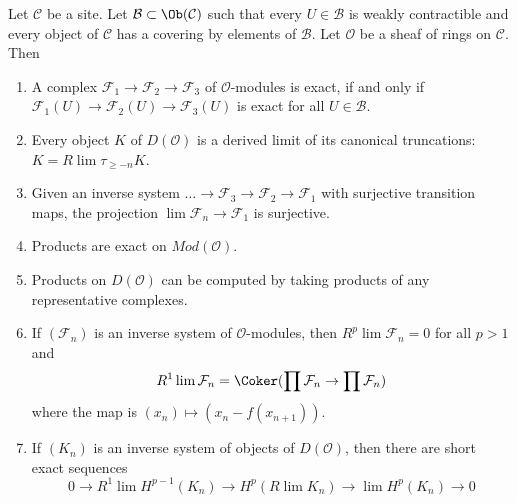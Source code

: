\begin{proposition}
\label{proposition-enough-weakly-contractibles}
Let $\mathcal{C}$ be a site. Let $\mathcal{B} \subset \Ob(\mathcal{C})$
such that every $U \in \mathcal{B}$ is weakly contractible and
every object of $\mathcal{C}$ has a covering by elements of $\mathcal{B}$.
Let $\mathcal{O}$ be a sheaf of rings on $\mathcal{C}$. Then
\begin{enumerate}
\item A complex $\mathcal{F}_1 \to \mathcal{F}_2 \to \mathcal{F}_3$
of $\mathcal{O}$-modules is exact, if and only if
$\mathcal{F}_1(U) \to \mathcal{F}_2(U) \to \mathcal{F}_3(U)$
is exact for all $U \in \mathcal{B}$.
\item Every object $K$ of $D(\mathcal{O})$ is a derived limit
of its canonical truncations: $K = R\lim \tau_{\geq -n} K$.
\item Given an inverse system
$\ldots \to \mathcal{F}_3 \to \mathcal{F}_2 \to \mathcal{F}_1$
with surjective transition maps, the projection
$\lim \mathcal{F}_n \to \mathcal{F}_1$ is surjective.
\item Products are exact on $\textit{Mod}(\mathcal{O})$.
\item Products on $D(\mathcal{O})$ can be computed by taking
products of any representative complexes.
\item If $(\mathcal{F}_n)$ is an inverse system of $\mathcal{O}$-modules,
then $R^p\lim \mathcal{F}_n = 0$ for all $p > 1$ and
$$
R^1\lim \mathcal{F}_n  =
\Coker(\prod \mathcal{F}_n \to \prod \mathcal{F}_n)
$$
where the map is $(x_n) \mapsto (x_n - f(x_{n + 1}))$.
\item If $(K_n)$ is an inverse system of objects of $D(\mathcal{O})$,
then there are short exact sequences
$$
0 \to R^1\lim H^{p - 1}(K_n) \to H^p(R\lim K_n) \to
\lim H^p(K_n) \to 0
$$
\end{enumerate}
\end{proposition}

